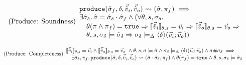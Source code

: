 \begin{equation}
\tag{Produce: Soundness}\label{eq:produce-sound}
\begin{array}{l}
\texttt{produce}(\hat{\sigma}_f,\delta,\vec{\hat{v}}_i,\vec{\hat{v}}_o)\rightsquigarrow (\hat{\sigma}, \pi_f) \implies\\
\exists \hat{\sigma}_\delta\ldotp \hat{\sigma}=\hat{\sigma}_\delta\cdot\hat{\sigma}_f \land (\forall\theta,s,\sigma_\delta\ldotp\\
\quad \theta(\pi\land\pi_f)=\texttt{true} \Rightarrow \llbracket\vec{\hat{v}}_i\rrbracket_{\theta,s}=\vec{v}_i \Rightarrow \llbracket\vec{\hat{v}}_o\rrbracket_{\theta,s}=\vec{v}_o \Rightarrow \\
\quad \theta,s,\sigma_\delta \models \hat{\sigma}_\delta \Rightarrow \sigma_\delta\models_\Delta\left<\delta\right>\!(\vec{v}_i;\vec{v}_o))
\end{array}
\end{equation}

\begin{equation}
\tag{Produce: Completeness}\label{eq:produce-complete}
\begin{array}{l}
\llbracket\vec{\hat{v}}_i\rrbracket_{\theta,s}=\vec{v}_i \land \llbracket\vec{\hat{v}}_o\rrbracket_{\theta,s}=\vec{v}_o~\land \theta,s,\sigma\models\hat{\sigma} \land \sigma_\delta \models_\Delta \left<\delta\right>\!(\vec{v}_i;\vec{v}_o) \land \sigma \# \sigma_\delta \implies\\
\quad \exists\hat{\sigma}_\delta,\pi_f\ldotp \texttt{produce}(\hat{\sigma},\delta,\vec{\hat{v}}_i,\vec{\hat{v}}_o)\rightsquigarrow (\hat{\sigma}\cdot\hat{\sigma}_\delta,\pi_f) \land \theta(\pi_f) = \texttt{true}  \land \theta,s,\sigma_\delta\models\hat{\sigma}_\delta
\end{array}
\end{equation}

